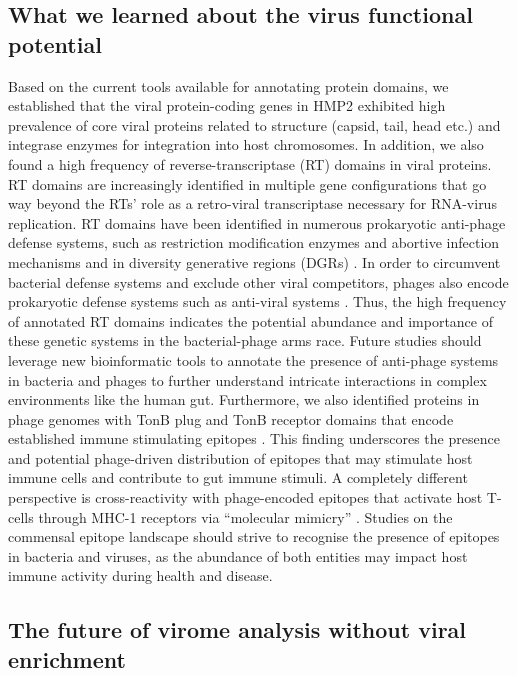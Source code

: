 \subsection{What we learned about the virus functional potential}

Based on the current tools available for annotating protein domains, we established that the viral protein-coding genes in HMP2 exhibited high prevalence of core viral proteins related to structure (capsid, tail, head etc.) and integrase enzymes for integration into host chromosomes. In addition, we also found a high frequency of reverse-transcriptase (RT) domains in viral proteins. RT domains are increasingly identified in multiple gene configurations that go way beyond the RTs’ role as a retro-viral transcriptase necessary for RNA-virus replication. RT domains have been identified in numerous prokaryotic anti-phage defense systems, such as restriction modification enzymes and abortive infection mechanisms \cite{Toro2019-zp} and in diversity generative regions (DGRs) \cite{Roux2020-mr}. In order to circumvent bacterial defense systems and exclude other viral competitors, phages also encode prokaryotic defense systems such as anti-viral systems \cite{Rousset2022-sn}. Thus, the high frequency of annotated RT domains indicates the potential abundance and importance of these genetic systems in the bacterial-phage arms race. Future studies should leverage new bioinformatic tools to annotate the presence of anti-phage systems in bacteria \cite{Payne2021-xt} and phages to further understand intricate interactions in complex environments like the human gut. Furthermore, we also identified proteins in phage genomes with TonB plug and TonB receptor domains that encode established immune stimulating epitopes \cite{Graham2018-me}. This finding underscores the presence and potential phage-driven distribution of epitopes that may stimulate host immune cells and contribute to gut immune stimuli. A completely different perspective is cross-reactivity with phage-encoded epitopes that activate host T-cells through MHC-1 receptors via “molecular mimicry” \cite{Fluckiger2020-ay}. Studies on the commensal epitope landscape should strive to recognise the presence of epitopes in bacteria and viruses, as the abundance of both entities may impact host immune activity during health and disease.

\subsection{The future of virome analysis without viral enrichment}


